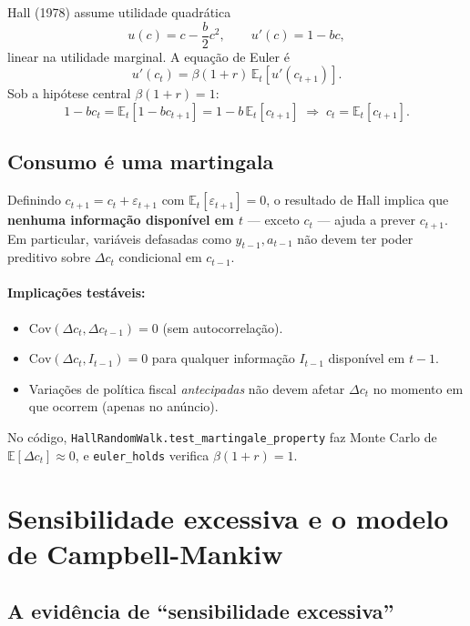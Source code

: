 \documentclass[11pt,a4paper]{article}
\newcommand{\E}{\mathbb{E}}
\begin{document}
Hall (1978) assume utilidade quadrática
\[
  u(c) = c - \frac{b}{2}c^2, \qquad u'(c) = 1 - bc,
\]
linear na utilidade marginal. A equação de Euler é
\[
  u'(c_t) = \beta(1+r)\,\E_t[u'(c_{t+1})].
\]
Sob a hipótese central $\beta(1+r) = 1$:
\[
  1 - bc_t = \E_t[1 - bc_{t+1}] = 1 - b\,\E_t[c_{t+1}]
  \;\Longrightarrow\;
  \boxed{c_t = \E_t[c_{t+1}].}
\]

\subsection{Consumo é uma martingala}

Definindo $c_{t+1} = c_t + \varepsilon_{t+1}$ com
$\E_t[\varepsilon_{t+1}] = 0$, o resultado de Hall implica que
\textbf{nenhuma informação disponível em $t$} --- exceto $c_t$ ---
ajuda a prever $c_{t+1}$. Em particular, variáveis defasadas como
$y_{t-1}, a_{t-1}$ não devem ter poder preditivo sobre $\Delta c_t$
condicional em $c_{t-1}$.

\paragraph{Implicações testáveis:}
\begin{itemize}
  \item $\mathrm{Cov}(\Delta c_t, \Delta c_{t-1}) = 0$ (sem autocorrelação).
  \item $\mathrm{Cov}(\Delta c_t, I_{t-1}) = 0$ para qualquer informação
    $I_{t-1}$ disponível em $t-1$.
  \item Variações de política fiscal \emph{antecipadas} não devem afetar
    $\Delta c_t$ no momento em que ocorrem (apenas no anúncio).
\end{itemize}

No código, \texttt{HallRandomWalk.test\_martingale\_property} faz Monte
Carlo de $\E[\Delta c_t]\approx 0$, e \texttt{euler\_holds} verifica
$\beta(1+r)=1$.

\section{Sensibilidade excessiva e o modelo de Campbell-Mankiw}

\subsection{A evidência de ``sensibilidade excessiva''}
\end{document}
